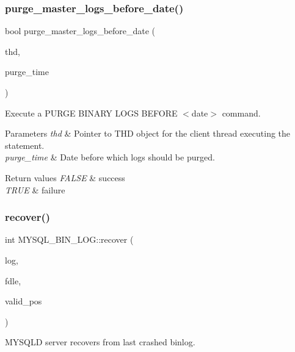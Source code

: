 \subsubsection{\texorpdfstring{purge\+\_\+master\+\_\+logs\+\_\+before\+\_\+date()}{purge\_master\_logs\_before\_date()}}
{\footnotesize\ttfamily bool purge\+\_\+master\+\_\+logs\+\_\+before\+\_\+date (\begin{DoxyParamCaption}\item[{T\+HD $\ast$}]{thd,  }\item[{time\+\_\+t}]{purge\+\_\+time }\end{DoxyParamCaption})}

Execute a P\+U\+R\+GE B\+I\+N\+A\+RY L\+O\+GS B\+E\+F\+O\+RE $<$date$>$ command.


\begin{DoxyParams}{Parameters}
{\em thd} & Pointer to T\+HD object for the client thread executing the statement.\\
\hline
{\em purge\+\_\+time} & Date before which logs should be purged.\\
\hline
\end{DoxyParams}

\begin{DoxyRetVals}{Return values}
{\em F\+A\+L\+SE} & success \\
\hline
{\em T\+R\+UE} & failure \\
\hline
\end{DoxyRetVals}
\mbox{\label{group__Binary__Log_ga0e843aafa062a4ab987d5ff75d450c41}} 
\subsubsection{\texorpdfstring{recover()}{recover()}}
{\footnotesize\ttfamily int M\+Y\+S\+Q\+L\+\_\+\+B\+I\+N\+\_\+\+L\+O\+G\+::recover (\begin{DoxyParamCaption}\item[{I\+O\+\_\+\+C\+A\+C\+HE $\ast$}]{log,  }\item[{\mbox{\hyperlink{classFormat__description__log__event}{Format\+\_\+description\+\_\+log\+\_\+event}} $\ast$}]{fdle,  }\item[{my\+\_\+off\+\_\+t $\ast$}]{valid\+\_\+pos }\end{DoxyParamCaption})}

M\+Y\+S\+Q\+LD server recovers from last crashed binlog.


